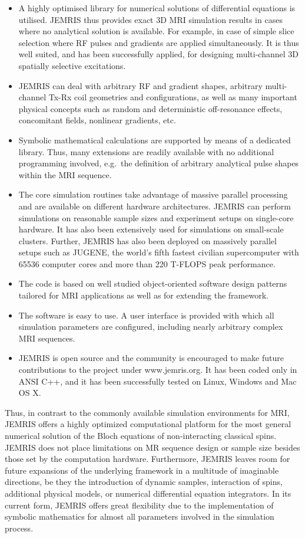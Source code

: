 \documentclass[journal,onecolumn,12pt]{IEEEtran}
\begin{document}
\begin{itemize}
 \item A highly optimised library for numerical solutions of differential equations is utilised. JEMRIS thus provides
   exact 3D MRI simulation results in cases where no analytical solution is available. For example, in case of simple
   slice selection where RF pulses and gradients are applied simultaneously. It is thus well suited, and has been
   successfully applied, for designing multi-channel 3D spatially selective excitations.
 \item JEMRIS can deal with arbitrary RF and gradient shapes, arbitrary multi-channel Tx-Rx coil geometries and
   configurations, as well as many important physical concepts such as random and deterministic off-resonance effects,
   concomitant fields, nonlinear gradients, etc.
 \item Symbolic mathematical calculations are supported by means of a dedicated library. Thus, many extensions are
   readily available with no additional programming involved, e.g.~the definition of arbitrary analytical pulse shapes
   within the MRI sequence.
 \item The core simulation routines take advantage of massive parallel processing and are available on different
   hardware architectures. JEMRIS can perform simulations on reasonable sample sizes and experiment setups on
   single-core hardware. It has also been extensively used for simulations on small-scale clusters. Further, JEMRIS has
   also been deployed on massively parallel setups such as JUGENE, the world’s fifth fastest civilian supercomputer with
   65536 computer cores and more than 220 T-FLOPS peak performance.
 \item The code is based on well studied object-oriented software design patterns tailored for MRI applications as well
   as for extending the framework.
 \item The software is easy to use. A user interface is provided with which all simulation parameters are configured,
   including nearly arbitrary complex MRI sequences.
 \item JEMRIS is open source and the community is encouraged to make future contributions to the project under {\sf
   www.jemris.org}. It has been coded only in ANSI C++, and it has been successfully tested on Linux, Windows and Mac OS
   X.
\end{itemize}

Thus, in contrast to the commonly available simulation environments for MRI, JEMRIS offers a highly optimized
computational platform for the most general numerical solution of the Bloch equations of non-interacting classical
spins.  JEMRIS does not place limitations on MR sequence design or sample size besides those set by the computation
hardware. Furthermore, JEMRIS leaves room for future expansions of the underlying framework in a multitude of imaginable
directions, be they the introduction of dynamic samples, interaction of spins, additional physical models, or numerical
differential equation integrators. In its current form, JEMRIS offers great flexibility due to the implementation of
symbolic mathematics for almost all parameters involved in the simulation process.
\end{document}
